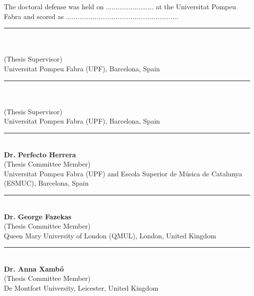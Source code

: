 
\newcommand\advisor[2]{
	\vspace{0.5cm}
	\begin{center}
		\rule{6cm}{0.8pt}\\
		\textbf{#1}\\
		(Thesis Supervisor)\\
		#2
	\end{center}
}
\newcommand\member[2]{
	\vspace{0.5cm}
	\begin{center}
		\rule{6cm}{0.8pt}\\
		\textbf{#1}\\
		(Thesis Committee Member) \\
		#2
	\end{center}
} 

\vspace{1cm}
\noindent The doctoral defense was held on ......................... at the Universitat Pompeu Fabra and scored as ...........................................................\par
\vspace{1cm}
\advisor{\supervisor}{Universitat Pompeu Fabra (UPF), Barcelona, Spain}
\advisor{\cosupervisor}{Universitat Pompeu Fabra (UPF), Barcelona, Spain}


\member{Dr. Perfecto Herrera}{Universitat Pompeu Fabra (UPF) and Escola Superior de Música de Catalunya (ESMUC), Barcelona, Spain}
\member{Dr. George Fazekas}{Queen Mary University of London (QMUL), London, United Kingdom}
\member{Dr. Anna Xamb\'{o}}{De Montfort University, Leicester, United Kingdom}